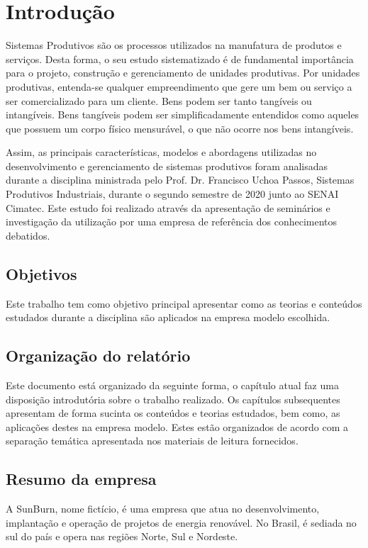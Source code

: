 \chapter{Introdução}
\label{chap:intro}
Sistemas Produtivos são os processos utilizados na manufatura de produtos e serviços. Desta forma, o seu estudo sistematizado é de fundamental importância para o projeto, construção e gerenciamento de unidades produtivas. Por unidades produtivas, entenda-se qualquer empreendimento que gere um bem ou serviço a ser comercializado para um cliente. Bens podem ser tanto tangíveis ou intangíveis. Bens tangíveis podem ser simplificadamente entendidos como aqueles que possuem um corpo físico mensurável, o que não ocorre nos bens intangíveis.

Assim, as principais características, modelos e abordagens utilizadas no desenvolvimento e gerenciamento de sistemas produtivos foram analisadas durante a disciplina ministrada pelo Prof. Dr. Francisco Uchoa Passos, Sistemas Produtivos Industriais, durante o segundo semestre de 2020 junto ao SENAI Cimatec. Este estudo foi realizado através da apresentação de seminários e investigação da utilização por uma empresa de referência dos conhecimentos debatidos.


\section{Objetivos}
\label{sec:obj}
Este trabalho tem como objetivo principal apresentar como as teorias e conteúdos estudados durante a disciplina são aplicados na empresa modelo escolhida.


\section{Organização do relatório}
\label{sec:org}
Este documento está organizado da seguinte forma, o capítulo atual faz uma disposição introdutória sobre o trabalho realizado. Os capítulos subsequentes apresentam de forma sucinta os conteúdos e teorias estudados, bem como, as aplicações destes na empresa modelo. Estes estão organizados de acordo com a separação temática apresentada nos materiais de leitura fornecidos.

\section{Resumo da empresa}
\label{sec:rese}
A SunBurn, nome fictício, é uma empresa que atua no desenvolvimento, implantação e operação de projetos de energia renovável. No Brasil, é sediada no sul do país e opera nas regiões Norte, Sul e Nordeste.

